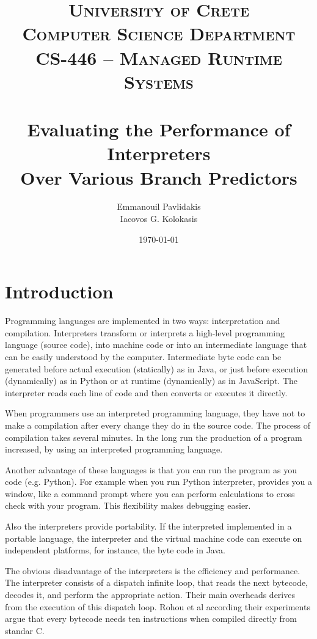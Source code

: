 \documentclass[parskip=full, paper=a4, fontsize=12pt]{scrartcl} %
\title{	
\normalfont \normalsize 
\textsc{University of Crete\\
Computer Science Department \\
CS-446 -- Managed Runtime Systems} \\ [20pt] 
\horrule{0.5pt} \\[0.4cm]
\huge
Evaluating the Performance of Interpreters\\Over Various Branch Predictors
\horrule{2pt} \\[0.5cm] 
}
\author{%
    Emmanouil Pavlidakis \\
    Iacovos G. Kolokasis%
    }
\date{\normalsize\today}
\numberwithin{equation}{section}
\numberwithin{figure}{section}
\numberwithin{table}{section}
\begin{document}
\maketitle 

\section{Introduction}

Programming languages are implemented in two ways: interpretation and
compilation. Interpreters transform or interprets a high-level
programming language (source code), into machine code or into an
intermediate language that can be easily understood by the computer.
Intermediate byte code can be generated before actual execution
(statically) as in Java, or just before execution (dynamically) as in
Python or at runtime (dynamically) as in JavaScript.  The interpreter
reads each line of code and then converts or executes it directly. 

When programmers use an interpreted programming language, they have
not to make a compilation after every change they do in the source
code.  The process of compilation takes several minutes. In the long
run the production of a program increased, by using an interpreted
programming language. 

Another advantage of these languages is that you can run the program
as you code (e.g. Python). For example when you run Python
interpreter, provides you a window, like a command prompt where you
can perform calculations to cross check with your program. This
flexibility makes debugging easier. 

Also the interpreters provide portability. If the interpreted
implemented in a portable language, the interpreter and the virtual
machine code can execute on independent platforms, for instance, the
byte code in Java.

The obvious disadvantage of the interpreters is the efficiency and
performance. The interpreter consists of a dispatch infinite loop,
that reads the next bytecode, decodes it, and perform the appropriate
action. Their main overheads derives from the execution of this
dispatch loop. Rohou et al {\color{red}{Citation here}} according
their experiments argue that every bytecode needs ten instructions
when compiled directly from standar C.
\end{document}
